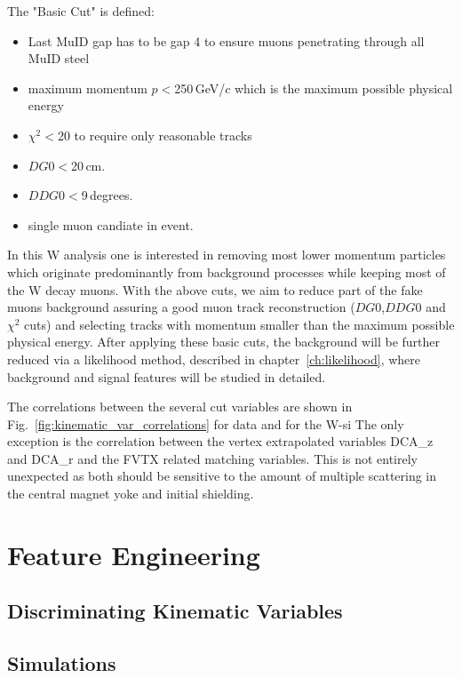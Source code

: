 The "Basic Cut" is defined:
\begin{itemize}
\item Last MuID gap has to be gap 4 to ensure muons penetrating through all MuID steel
\item maximum momentum $p$$<$250\,GeV/$c$ which is the maximum possible physical energy
\item $\chi^2$$<$20 to require only reasonable tracks
\item $DG0$$<$20\,cm.
\item $DDG0$$<$9\,degrees.
\item single muon candiate in event.
\end{itemize}


In this W analysis one is interested in removing most lower momentum particles
which originate predominantly from background processes while keeping most of
the W decay muons. With the above cuts, we aim to reduce part of the fake muons
background assuring a good muon track reconstruction ($DG0$,$DDG0$ and $\chi^2$
cuts) and selecting tracks with momentum smaller than the maximum possible
physical energy. After applying these basic cuts, the background will be further
reduced via a likelihood method, described in chapter~\ref{ch:likelihood}, where
background and signal features will be studied in detailed.

The correlations between the several cut variables are shown in
Fig.~\ref{fig:kinematic_var_correlations} for data and for the W-si The only
exception is the correlation between the vertex extrapolated variables DCA\_z
and DCA\_r and the FVTX related matching variables. This is not entirely
unexpected as both should be sensitive to the amount of multiple scattering in
the central magnet yoke and initial shielding.

\section{Feature Engineering}
\subsection{Discriminating Kinematic Variables}
\subsection{Simulations}
